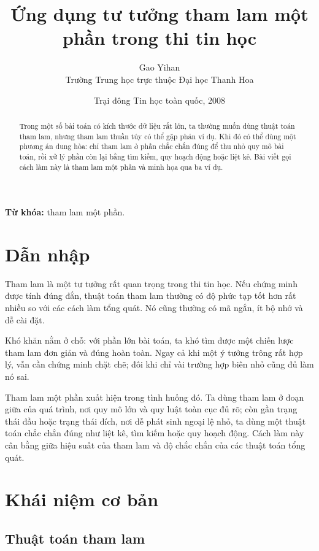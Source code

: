 \documentclass[11pt]{article}
\title{Ứng dụng tư tưởng tham lam một phần trong thi tin học}
\author{Gao Yihan\\Trường Trung học trực thuộc Đại học Thanh Hoa}
\date{Trại đông Tin học toàn quốc, 2008}
\begin{document}
\maketitle


\renewcommand{\abstractname}{Tóm tắt}
\begin{abstract}
Trong một số bài toán có kích thước dữ liệu rất lớn, ta thường muốn dùng
thuật toán tham lam, nhưng tham lam thuần túy có thể gặp phản ví dụ. Khi đó
có thể dùng một phương án dung hòa: chỉ tham lam ở phần chắc chắn đúng để thu
nhỏ quy mô bài toán, rồi xử lý phần còn lại bằng tìm kiếm, quy hoạch động
hoặc liệt kê. Bài viết gọi cách làm này là tham lam một phần và minh họa qua
ba ví dụ.
\end{abstract}

\noindent\textbf{Từ khóa:} tham lam một phần.

\section{Dẫn nhập}

Tham lam là một tư tưởng rất quan trọng trong thi tin học. Nếu chứng minh
được tính đúng đắn, thuật toán tham lam thường có độ phức tạp tốt hơn rất
nhiều so với các cách làm tổng quát. Nó cũng thường có mã ngắn, ít bộ nhớ và
dễ cài đặt.

Khó khăn nằm ở chỗ: với phần lớn bài toán, ta khó tìm được một chiến lược tham
lam đơn giản và đúng hoàn toàn. Ngay cả khi một ý tưởng trông rất hợp lý, vẫn
cần chứng minh chặt chẽ; đôi khi chỉ vài trường hợp biên nhỏ cũng đủ làm nó
sai.

Tham lam một phần xuất hiện trong tình huống đó. Ta dùng tham lam ở đoạn giữa
của quá trình, nơi quy mô lớn và quy luật toàn cục đủ rõ; còn gần trạng thái
đầu hoặc trạng thái đích, nơi dễ phát sinh ngoại lệ nhỏ, ta dùng một thuật
toán chắc chắn đúng như liệt kê, tìm kiếm hoặc quy hoạch động. Cách làm này
cân bằng giữa hiệu suất của tham lam và độ chắc chắn của các thuật toán tổng
quát.

\section{Khái niệm cơ bản}

\subsection{Thuật toán tham lam}
\end{document}
